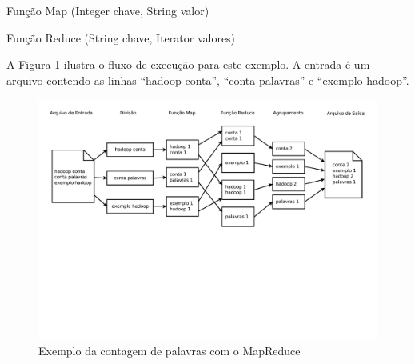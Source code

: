 
\begin{algorithm}	
	\caption{Função Map (Integer chave, String valor)}\label{funcaoMap}
\end{algorithm}

\begin{algorithm}	 
	\caption{Função Reduce (String chave, Iterator valores)}\label{funcaoReduce}
\end{algorithm}


A Figura \ref{fig:MapReduceexemplo} ilustra o fluxo de execução para este exemplo. A entrada é um arquivo contendo as linhas ``hadoop conta'', ``conta palavras'' e ``exemplo hadoop''.

\begin{figure}[!h]
\centering
\includegraphics[trim=0cm 9cm 0cm 0cm, width=\textwidth]{figuras/MapReduceExemplo.pdf}
\caption{Exemplo da contagem de palavras com o MapReduce}
\label{fig:MapReduceexemplo}
\end{figure}

